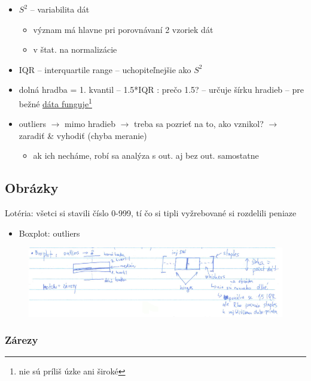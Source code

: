 \documentclass[unknownkeysallowed]{article}
\begin{document}
\begin{itemize}
\item $S^2$ -- variabilita dát
	\begin{itemize}
		\item význam má hlavne pri porovnávaní 2 vzoriek dát
		\item v štat. na normalizácie
	\end{itemize}
\item IQR -- interquartile range -- uchopiteľnejšie ako $S^2$
\item dolná hradba = 1. kvantil -- 1.5*IQR : prečo 1.5? -- určuje šírku hradieb -- pre bežné \underline{dáta funguje}\footnote{nie sú príliš úzke ani široké}
\item outliers $\to$ mimo hradieb $\to$ treba sa pozrieť na to, ako vznikol? $\to$ zaradiť \& vyhodiť (chyba meranie)
	\begin{itemize}
	\item ak ich necháme, robí sa analýza s out. aj bez out. samostatne
	\end{itemize}
\end{itemize}

\subsection*{Obrázky}
Lotéria: všetci si stavili číslo 0-999, tí čo si tipli vyžrebované si rozdelili peniaze

\begin{itemize}
\item Boxplot: outliers
\end{itemize}

\begin{figure}[ht]
\includegraphics[width=\textwidth]{imgs/obr2.png}
\centering
\end{figure}


\subsubsection*{Zárezy}
\end{document}
